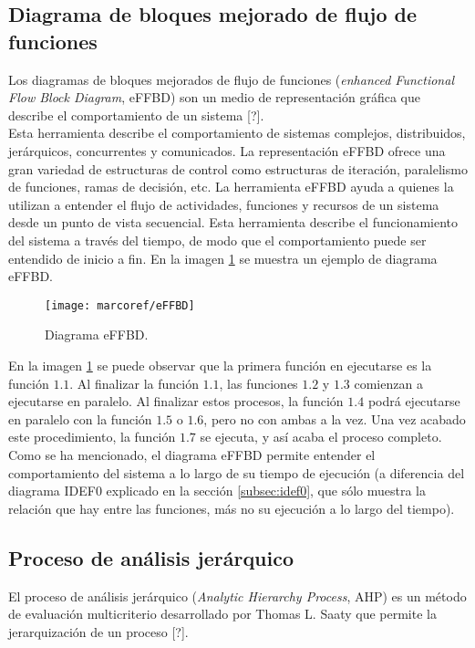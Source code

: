 		\subsection{Diagrama de bloques mejorado de flujo de funciones} \label{subsec:effbd}
Los diagramas de bloques mejorados de flujo de funciones (\textit{enhanced Functional Flow Block Diagram}, eFFBD) son un medio de representaci\'on gr\'afica que describe el comportamiento de un sistema [?].\\

\noindent Esta herramienta describe el comportamiento de sistemas complejos, distribuidos, jer\'arquicos, concurrentes y comunicados. La representaci\'on eFFBD ofrece una gran variedad de estructuras de control como estructuras de iteraci\'on, paralelismo de funciones, ramas de decisi\'on, etc. La herramienta eFFBD ayuda a quienes la utilizan a entender el flujo de actividades, funciones y recursos de un sistema desde un punto de vista secuencial. Esta herramienta describe el funcionamiento del sistema a trav\'es del tiempo, de modo que el comportamiento puede ser entendido de inicio a fin. En la imagen \ref{img:diagramaeFFBD} se muestra un ejemplo de diagrama eFFBD.

\begin{figure}[H]
	\centering
		\texttt{[image: marcoref/eFFBD]}
	\caption{Diagrama eFFBD.}
	\label{img:diagramaeFFBD}
\end{figure}

En la imagen \ref{img:diagramaeFFBD} se puede observar que la primera funci\'on en ejecutarse es la funci\'on $1.1$. Al finalizar la funci\'on $1.1$, las funciones $1.2$ y $1.3$ comienzan a ejecutarse en paralelo. Al finalizar estos procesos, la funci\'on $1.4$ podr\'a ejecutarse en paralelo con la funci\'on $1.5$ o $1.6$, pero no con ambas a la vez. Una vez acabado este procedimiento, la funci\'on $1.7$ se ejecuta, y as\'i acaba el proceso completo.\\

\noindent Como se ha mencionado, el diagrama eFFBD permite entender el comportamiento del sistema a lo largo de su tiempo de ejecuci\'on (a diferencia del diagrama IDEF0 explicado en la secci\'on \ref{subsec:idef0}, que s\'olo muestra la relaci\'on que hay entre las funciones, m\'as no su ejecuci\'on a lo largo del tiempo).

		\subsection{Proceso de an\'alisis jer\'arquico} \label{subsec:ahp}
El proceso de an\'alisis jer\'arquico (\textit{Analytic Hierarchy Process}, AHP) es un m\'etodo de evaluaci\'on multicriterio desarrollado por Thomas L. Saaty que permite la jerarquizaci\'on de un proceso [?].\\


